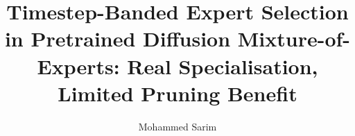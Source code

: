 \documentclass[10pt]{article}
\title{Timestep-Banded Expert Selection in Pretrained Diffusion Mixture-of-Experts: Real Specialisation, Limited Pruning Benefit}
\author{\name Mohammed Sarim \email \todo{email} \\
      \addr \todo{affiliation}}
\begin{document}
\maketitle

\begin{abstract}

\end{abstract}












\appendix

\end{document}
